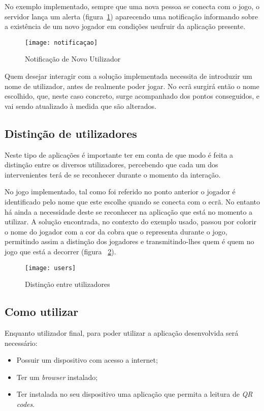 	No exemplo implementado, sempre que uma nova pessoa se conecta com o jogo, o servidor lança um alerta (figura~\ref{fig:novo}) aparecendo uma notificação informando sobre a existência de um novo jogador em condições usufruir da aplicação presente. 
	
	\begin{figure}[ht]
		\centering
		\texttt{[image: notificaçao]}
		\caption[Novo Utilizador] {Notificação de Novo Utilizador}
		\label{fig:novo}
	\end{figure}

	Quem desejar interagir com a solução implementada necessita de introduzir um nome de utilizador, antes de realmente poder jogar. No ecrã surgirá então o nome escolhido, que, neste caso concreto, surge acompanhado dos pontos conseguidos, e vai sendo atualizado à medida que são alterados.
	

	\subsection{Distinção de utilizadores}

	Neste tipo de aplicações é importante ter em conta de que modo é feita a distinção entre os diversos utilizadores, percebendo que cada um dos intervenientes terá de se reconhecer durante o momento da interação. 

	No jogo implementado, tal como foi referido no ponto anterior o jogador é identificado pelo nome que este escolhe quando se conecta com o ecrã. No entanto há ainda a necessidade deste se reconhecer na aplicação que está no momento a utilizar. A solução encontrada, no contexto do exemplo usado, passou por colorir o nome do jogador com a cor da cobra que o representa durante o jogo, permitindo assim a distinção dos jogadores e transmitindo-lhes quem é quem no jogo que está a decorrer (figura ~\ref{fig:user}).

	\begin{figure}[ht]
		\centering
		\texttt{[image: users]}
		\caption[Distinção de Utilizadores]{Distinção entre utilizadores}
		\label{fig:user}
	\end{figure}

	\subsection{Como utilizar}

	Enquanto utilizador final, para poder utilizar a aplicação desenvolvida será necessário:
	\begin{itemize}
		\item Possuir um dispositivo com acesso a internet;
		\item Ter um \textit{browser} instalado;
		\item Ter instalada no seu dispositivo uma aplicação que permita a leitura de \textit{QR codes}.
	\end{itemize}

